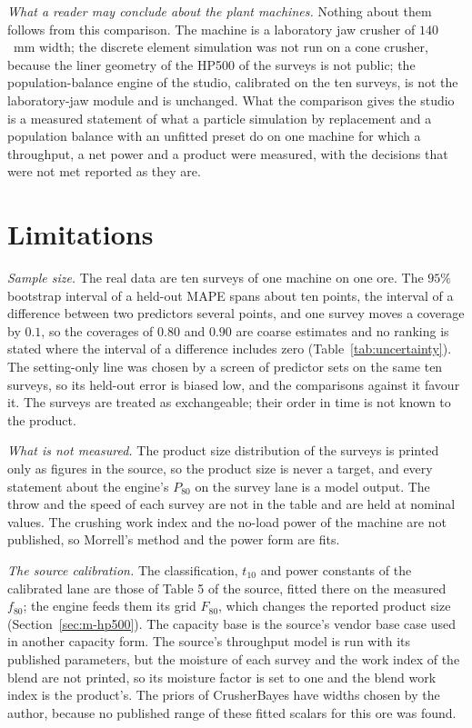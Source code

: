 \emph{What a reader may conclude about the plant machines.} Nothing about them follows from this comparison. The machine is a laboratory jaw crusher of $140$~mm width; the discrete element simulation was not run on a cone crusher, because the liner geometry of the HP500 of the surveys is not public; the population-balance engine of the studio, calibrated on the ten surveys, is not the laboratory-jaw module and is unchanged. What the comparison gives the studio is a measured statement of what a particle simulation by replacement and a population balance with an unfitted preset do on one machine for which a throughput, a net power and a product were measured, with the decisions that were not met reported as they are.

\section{Limitations}\label{sec:limits}

\emph{Sample size.} The real data are ten surveys of one machine on one ore. The $95\%$ bootstrap interval of a held-out MAPE spans about ten points, the interval
of a difference between two predictors several points, and one survey moves a coverage by $0.1$, so the coverages of $0.80$ and $0.90$ are coarse
estimates and no ranking is stated where the interval of a difference includes zero (Table~\ref{tab:uncertainty}). The setting-only line was chosen
by a screen of predictor sets on the same ten surveys, so its held-out error is biased low, and the comparisons against it favour it. The surveys are treated as exchangeable; their order in time is not known to the product.

\emph{What is not measured.} The product size distribution of the surveys is printed only as figures in the source, so the product size is never a target,
and every statement about the engine's $P_{80}$ on the survey lane is a model output. The throw and the speed of each survey are not in the table and are
held at nominal values. The crushing work index and the no-load power of the machine are not published, so Morrell's method and the power form are fits.

\emph{The source calibration.} The classification, $t_{10}$ and power constants of the calibrated lane are those of Table 5 of the source, fitted
there on the measured $f_{80}$; the engine feeds them its grid $F_{80}$, which changes the reported product size (Section~\ref{sec:m-hp500}). The
capacity base is the source's vendor base case used in another capacity form. The source's throughput model is run with its published parameters,
but the moisture of each survey and the work index of the blend are not printed, so its moisture factor is set to one and the blend work index is
the product's. The priors of CrusherBayes have widths chosen by the author, because no published range of these fitted scalars for this
ore was found.

